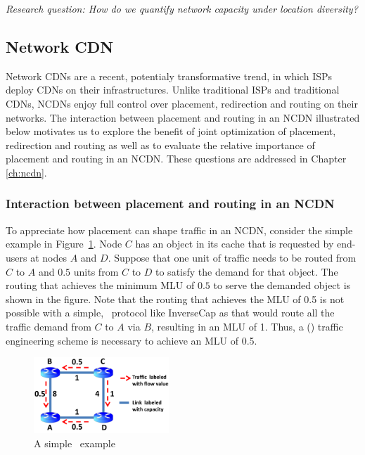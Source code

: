 
\emph{Research question: How do we quantify network capacity under location diversity?}

\subsection{Network CDN}
\label{sec:bg-ncdn}
Network CDNs are a recent, potentialy transformative trend, in which ISPs deploy CDNs on their infrastructures.  Unlike traditional ISPs and traditional CDNs, NCDNs enjoy full control over placement, redirection and routing on their networks. The interaction between placement and routing in an NCDN illustrated below motivates us to explore the benefit of joint optimization of placement, redirection and routing as well as to evaluate the relative importance of placement and routing in an NCDN. These questions are addressed in Chapter \ref{ch:ncdn}.

\subsubsection{Interaction between placement and routing in an NCDN}
\label{sec:bg-ncdn-interaction}

To appreciate how placement can shape traffic in an NCDN, consider the simple example in Figure~\ref{fig:NetworkExample}. Node $C$ has an object in its cache that is requested by end-users at nodes $A$ and $D$. Suppose that one unit of traffic needs to be routed from $C$ to $A$ and $0.5$ units  from $C$ to $D$ to satisfy the demand for that object. The routing that achieves the minimum MLU of $0.5$ to serve the demanded object is shown in the figure. Note that the routing that achieves the MLU of 0.5 is not possible with a simple, \unplanned\ protocol like InverseCap as that would route all the traffic demand from $C$ to $A$ via $B$, resulting in an MLU of 1. Thus, a (\planned) traffic engineering scheme is necessary to achieve an MLU of 0.5.

\begin{figure}[h]
	\centering
	\includegraphics[width=2in]{ncdnpaper/ncdn-example}
	\caption{A simple \ncp\ example}
	\vspace{-.3in}
	\label{fig:NetworkExample}
\end{figure}

